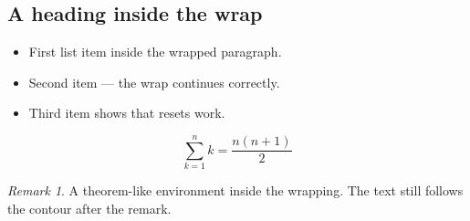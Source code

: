 \documentclass{article}
\theoremstyle{remark}
\newtheorem*{remark}{Remark}
\begin{document}
\lipsum[1]

\subsection*{A heading inside the wrap}
\lipsum[2]

\begin{itemize}
  \item First list item inside the wrapped paragraph.
  \item Second item — the wrap continues correctly.
  \item Third item shows that \texttt{\string\everypar} resets work.
\end{itemize}

\lipsum[3]

\[
  \sum_{k=1}^{n} k = \frac{n(n+1)}{2}
\]

\lipsum[4]

\begin{remark}
  A theorem-like environment inside the wrapping.
  The text still follows the contour after the remark.
\end{remark}

\lipsum[5-6]
\end{document}
